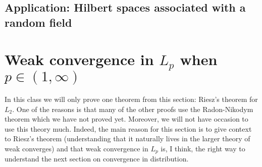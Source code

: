 \subsection{Application: Hilbert spaces associated with a random field}






\clearpage
%
%
\section{Weak convergence in $L_p$ when $p\in (1,\infty)$}

In this class we will only prove one theorem from this section:  Riesz's theorem for $L_2$. One of the reasons is that many of the other proofs use the Radon-Nikodym theorem which we have not proved yet. Moreover, we will not have occasion to use this theory much. Indeed, the main reason for this section is to give context to Riesz's theorem (understanding that it naturally lives in the larger theory of weak converges) and that weak convergence in $L_p$ is, I think, the right way to understand the next section on convergence in distribution.

